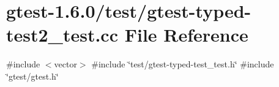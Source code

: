 \hypertarget{gtest-typed-test2__test_8cc}{\section{gtest-\/1.6.0/test/gtest-\/typed-\/test2\-\_\-test.cc \-File \-Reference}
\label{da/d89/gtest-typed-test2__test_8cc}
}
{\ttfamily \#include $<$vector$>$}\*
{\ttfamily \#include \char`\"{}test/gtest-\/typed-\/test\-\_\-test.\-h\char`\"{}}\*
{\ttfamily \#include \char`\"{}gtest/gtest.\-h\char`\"{}}\*
